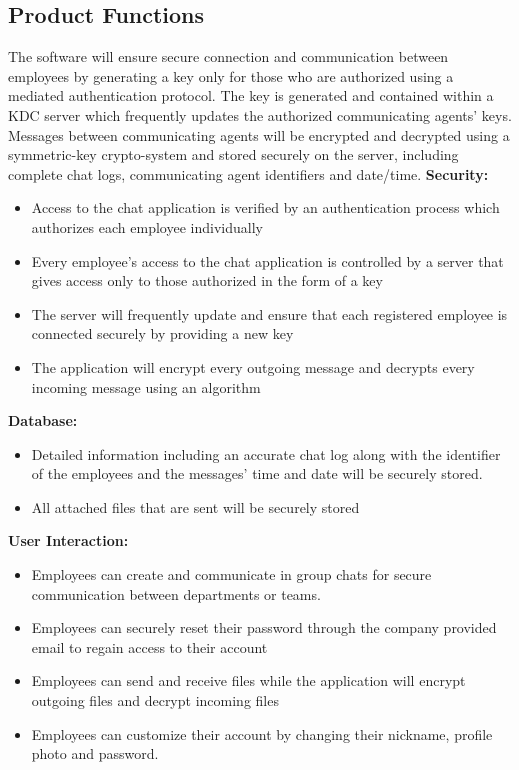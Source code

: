 \documentclass[]{article}
\begin{document}
\subsection{Product Functions}
\label{sub:product_functions}
\hspace{5mm}The software will ensure secure connection and communication between employees by generating a key only for those who are authorized using a mediated authentication protocol. The key is generated and contained within a KDC server which frequently updates the authorized communicating agents’ keys. Messages between communicating agents will be encrypted and decrypted using a symmetric-key crypto-system and stored securely on the server, including complete chat logs, communicating agent identifiers and date/time. 
\newline
\newline
\textbf{Security:}
\begin{itemize}
\item Access to the chat application is verified by an authentication process which authorizes each employee individually 
\item Every employee’s access to the chat application is controlled by a server that gives access only to those authorized in the form of a key  
\item The server will frequently update and ensure that each registered employee is connected securely by providing a new key 
\item The application will encrypt every outgoing message and decrypts every incoming message using an algorithm 
\end{itemize}
\textbf{Database:}   
\begin{itemize}
\item Detailed information including an accurate chat log along with the identifier of the employees and the messages’ time and date will be securely stored. 
\item All attached files that are sent will be securely stored 
\end{itemize}
\textbf{User Interaction:}  
\begin{itemize}
\item Employees can create and communicate in group chats for secure communication between departments or teams. 
\item Employees can securely reset their password through the company provided email to regain access to their account 
\item Employees can send and receive files while the application will encrypt outgoing files and decrypt incoming files 
\item Employees can customize their account by changing their nickname, profile photo and password. 
\end{itemize}
\end{document}
